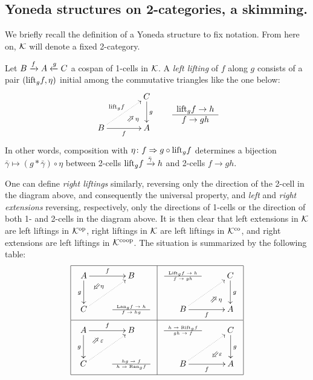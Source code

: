 \subsection{Yoneda structures on 2-categories, a skimming.}
We briefly recall the definition of a Yoneda structure \cite{street1978yoneda} to fix notation.
From here on, $\mathcal{K}$ will denote a fixed 2-category.
\begin{definition}
Let $B \xrightarrow{f} A \xleftarrow{g}C$ a cospan of 1-cells in $\mathcal{K}$. A \emph{left lifting} of $f$ along $g$ consists of a pair $(\text{lift}_gf,\eta)$ initial among the commutative triangles like the one below:
\[
\vcenter{\xymatrix@C=1.4cm{& C\ar[d]^g \\ B\ar[r]_f \ar@{.>}[ur]^{\leeft_gf} & \ar@{}[ul]|(.3){\Nearrow\eta} A}} \qquad \deduction{\leeft_gf}{h}{f}{gh}
\]
In other words, composition with $\eta \colon f \Rightarrow g \circ \text{lift}_gf$ determines a bijection $\bar\gamma \mapsto (g * \bar\gamma)\circ \eta$ between 2-cells $\text{lift}_gf \xrightarrow{\bar\gamma} h$ and 2-cells $f \to gh$.
\end{definition}
\begin{remark}
One can define \emph{right liftings} similarly, reversing only the direction of the 2-cell in the diagram above, and consequently the universal property, and \emph{left} and \emph{right extensions} reversing, respectively, only the directions of 1-cells or the direction of both 1- and 2-cells in the diagram above. It is then clear that left extensions in $\mathcal{K}$ are left liftings in $\mathcal{K}^{\text{op}}$, right liftings in $\mathcal{K}$ are left liftings in $\mathcal{K}^{\text{co}}$, and right extensions are left liftings in  $\mathcal{K}^{\text{coop}}$. The situation is summarized by the following table:
\[
\begin{array}{|c|c|}\hline
\xymatrix{A \ar@{}[dr]|(.3){\Swarrow\eta}\ar[d]_g \ar[r]^f& B \\ C \ar@{.>}[ur] & {\tiny \deduction{\Lan_gf}{h}{f}{hg}}} 
& 
\xymatrix{{\tiny \deduction{\Lift_gf}{h}{f}{gh}} & C\ar[d]^g \\ B\ar[r]_f \ar@{.>}[ur] & \ar@{}[ul]|(.3){\Nearrow\eta} A} \\ \hline
\xymatrix{A \ar@{}[dr]|(.3){\Nearrow\varepsilon}\ar[d]_g \ar[r]^f& B \\ C \ar@{.>}[ur] & {\tiny \deduction{hg}{f}{h}{\Ran_gf}}} 
& 
\xymatrix{{\tiny \deduction{h}{\Rift_gf}{gh}{f}} & C\ar[d]^g \\ B\ar[r]_f \ar@{.>}[ur] & \ar@{}[ul]|(.3){\Swarrow\varepsilon} A} \\ \hline
\end{array}
\]
\end{remark}
